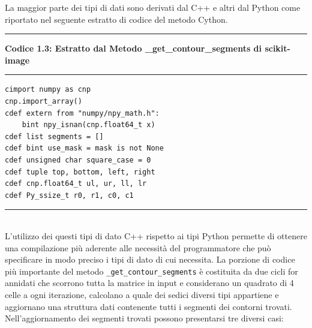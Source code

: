\documentclass[12pt,a4paper]{report}
\begin{document}
La maggior parte dei tipi di dati sono derivati dal C++ e altri dal Python come riportato nel seguente estratto di codice del metodo Cython.  \newpage
\noindent\rule[0.5ex]{\linewidth}{2pt}
\small{\textbf{Codice 1.3: Estratto dal Metodo \_get\_contour\_segments di scikit-image}} \\
\noindent\rule[0.5ex]{\linewidth}{1pt}
\begin{lstlisting}
cimport numpy as cnp
cnp.import_array()
cdef extern from "numpy/npy_math.h":
    bint npy_isnan(cnp.float64_t x)
cdef list segments = []
cdef bint use_mask = mask is not None
cdef unsigned char square_case = 0
cdef tuple top, bottom, left, right
cdef cnp.float64_t ul, ur, ll, lr
cdef Py_ssize_t r0, r1, c0, c1
\end{lstlisting}
\noindent\rule[0.5ex]{\linewidth}{1pt} \\[10pt]
L'utilizzo dei questi tipi di dato C++ rispetto ai tipi Python permette di ottenere una compilazione più aderente alle necessità del programmatore che può specificare in modo preciso i tipi di dato di cui necessita. \newline
La porzione di codice più importante del metodo \verb|_get_contour_segments| è costituita da due cicli for annidati che scorrono tutta la matrice in input e considerano un quadrato di 4 celle a ogni iterazione, calcolano a quale dei sedici diversi tipi appartiene e aggiornano una struttura dati contenente tutti i segmenti dei contorni trovati. \newline
Nell'aggiornamento dei segmenti trovati possono presentarsi tre diversi casi:
\end{document}
